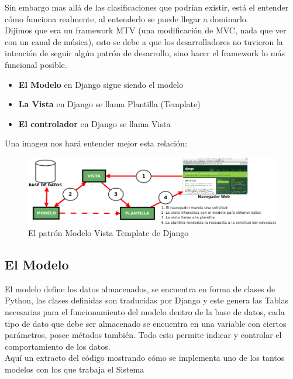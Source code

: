 Sin embargo mas allá de las clasificaciones que podrían existir, está el entender cómo funciona realmente, al entenderlo se puede llegar a dominarlo. \\[0.1cm]

Dijimos que era un framework MTV (una modificación de MVC, nada que ver con un canal de música), esto se debe a que los desarrolladores no tuvieron la  intención de seguir algún patrón de desarrollo, sino hacer el framework lo más funcional posible.

\begin{itemize}
    \item {\bfseries  El Modelo} en Django sigue siendo el modelo
    \item {\bfseries La Vista} en Django se llama Plantilla (Template)
    \item {\bfseries El controlador} en Django se llama Vista
\end{itemize}

Una imagen nos hará entender mejor esta relación:

\begin{figure}[h]
    \centering
    \includegraphics[scale=0.5]{resourse/esquema-mtv.png}
    \caption{El patrón Modelo Vista Template de Django}
    \label{fig:04}
\end{figure}   



\subsection{El Modelo}

El modelo define los datos almacenados, se encuentra en forma de clases de Python, las clases definidas son traducidas por Django y este genera las Tablas necesarias para el funcionamiento del modelo dentro de la base de datos, cada tipo de dato que debe ser almacenado se encuentra en una variable con ciertos parámetros, posee métodos también. Todo esto permite indicar y controlar el comportamiento de los datos.\\[0.1cm]

Aquí un extracto del código mostrando cómo se implementa uno de los tantos modelos con los que trabaja el Sistema\\[0.3cm]


